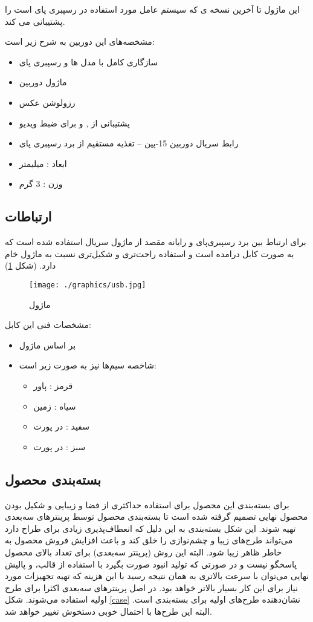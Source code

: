 \documentclass{article}
\begin{document}
این ماژول تا آخرین نسخه ی  که سیستم عامل مورد استفاده در رسپبری پای است را پشتیبانی می کند.

مشخصه‌های این دوربین به شرح زیر است:
\begin{itemize}
	\item سازگاری کامل با مدل ها  و  رسپبری پای
	\item ماژول دوربین 
	\item رزولوشن عکس 
	\item پشتیبانی از  ,  و   برای ضبط ویدیو
	\item رابط سریال دوربین 15-پین   – تغذیه مستقیم از برد رسپبری پای
	\item ابعاد :   میلیمتر
	\item وزن : 3 گرم
\end{itemize}		

\subsection{ارتباطات}
برای ارتباط بین برد رسپبری‌پای و رایانه مقصد از ماژول سریال  استفاده
شده است که به صورت کابل درامده است و استفاده راحت‌تری و شکیل‌تری نسبت به ماژول خام دارد.
(شکل \ref{usb})

\begin{figure}
	\centering
	\texttt{[image: ./graphics/usb.jpg]}
	\caption{ماژول }
	\label{usb}
\end{figure}

 مشخصات فنی این کابل:
 \begin{itemize}
 	\item بر اساس ماژول 
 	\item شاخصه‌ سیم‌ها نیز به صورت زیر است:
 	\begin{itemize}[*]
 		\item قرمز : پاور
 		\item سیاه : زمین
 		\item سفید :  در پورت 
 		\item سبز :   در پورت 
 	\end{itemize}
 \end{itemize}

\subsection{بسته‌بندی محصول}
برای بسته‌بندی این محصول برای استفاده حداکثری از فضا و زیبایی و شکیل بودن محصول نهایی تصمیم
گرفته شده است تا بسته‌بندی محصول توسط پرینترهای سه‌بعدی تهیه شوند. این شکل بسته‌بندی به این دلیل که انعطاف‌پذیری زیادی برای طراح دارد می‌تواند طرح‌های زیبا و چشم‌نوازی را خلق کند و باعث
افزایش فروش محصول به خاطر ظاهر زیبا شود. البته این روش (پرینتر سه‌بعدی) برای تعداد بالای
محصول پاسخگو نیست و در صورتی که تولید انبود صورت بگیرد با استفاده از قالب، و پالیش نهایی
می‌توان با سرعت بالاتری به همان نتیجه رسید با این هزینه که تهیه تجهیزات مورد نیاز برای این
کار بسیار بالاتر خواهد بود. در اصل پرینترهای سه‌بعدی اکثرا برای طرح اولیه استفاده می‌شوند. شکل \ref{case} نشان‌دهنده طرح‌های اولیه برای بسته‌بندی است. البته این طرح‌ها با احتمال خوبی دستخوش تغییر خواهد شد.
\end{document}
